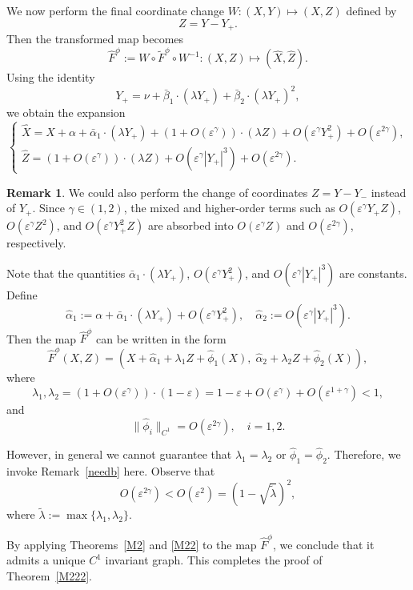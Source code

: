 \documentclass{amsart}
\theoremstyle{definition}
\newtheorem{Remark}[Definition]{Remark}
\begin{document}
We now perform the final coordinate change $W : (X, Y) \mapsto (X, Z)$ defined by
\[
Z = Y - Y_+.
\]
Then the transformed map becomes
\[
\hat{F}^\phi := W \circ \tilde{F}^\phi \circ W^{-1} : (X, Z) \mapsto (\hat{X}, \hat{Z}).
\]
Using the identity
\[
Y_+ = \nu + \bar{\beta}_1 \cdot (\lambda Y_+) + \bar{\beta}_2 \cdot (\lambda Y_+)^2,
\]
we obtain the expansion
\[
\left\{
\begin{array}{ll}
\hat{X} = X + \alpha + \bar{\alpha}_1 \cdot (\lambda Y_+) + (1 + O(\varepsilon^\gamma)) \cdot (\lambda Z) + O(\varepsilon^\gamma Y_+^2) + O(\varepsilon^{2\gamma}), \\
\hat{Z} = (1 + O(\varepsilon^\gamma)) \cdot (\lambda Z) + O(\varepsilon^\gamma |Y_+|^3) + O(\varepsilon^{2\gamma}).
\end{array}
\right.
\]

\begin{Remark}
We could also perform the change of coordinates $Z = Y - Y_-$ instead of $Y_+$. Since $\gamma \in (1,2)$, the mixed and higher-order terms such as $O(\varepsilon^\gamma Y_+ Z)$, $O(\varepsilon^\gamma Z^2)$, and $O(\varepsilon^\gamma Y_+^2 Z)$ are absorbed into $O(\varepsilon^\gamma Z)$ and $O(\varepsilon^{2\gamma})$, respectively.
\end{Remark}

Note that the quantities $\bar{\alpha}_1 \cdot (\lambda Y_+)$, $O(\varepsilon^\gamma Y_+^2)$, and $O(\varepsilon^\gamma |Y_+|^3)$ are constants. Define
\[
\hat{\alpha}_1 := \alpha + \bar{\alpha}_1 \cdot (\lambda Y_+) + O(\varepsilon^\gamma Y_+^2), \quad
\hat{\alpha}_2 := O(\varepsilon^\gamma |Y_+|^3).
\]
Then the map $\hat{F}^\phi$ can be written in the form
\[
\hat{F}^\phi(X, Z) = \left(X + \hat{\alpha}_1 + \lambda_1 Z + \hat{\phi}_1(X),\; \hat{\alpha}_2 + \lambda_2 Z + \hat{\phi}_2(X)\right),
\]
where
\[
\lambda_1, \lambda_2 = (1 + O(\varepsilon^\gamma)) \cdot (1 - \varepsilon) = 1 - \varepsilon + O(\varepsilon^\gamma) + O(\varepsilon^{1 + \gamma}) < 1,
\]
and
\[
\|\hat{\phi}_i\|_{C^1} = O(\varepsilon^{2\gamma}), \quad i = 1, 2.
\]

However, in general we cannot guarantee that $\lambda_1 = \lambda_2$ or $\hat{\phi}_1 = \hat{\phi}_2$. Therefore, we invoke Remark~\ref{needb} here. Observe that
\[
O(\varepsilon^{2\gamma}) <O(\varepsilon^2) = \left(1 - \sqrt{\tilde{\lambda}}\right)^2,
\]
where $\tilde{\lambda} := \max\{\lambda_1, \lambda_2\}$.

By applying Theorems~\ref{M2} and \ref{M22} to the map $\hat{F}^\phi$, we conclude that it admits a unique $C^1$ invariant graph. This completes the proof of Theorem~\ref{M222}.
\end{document}
